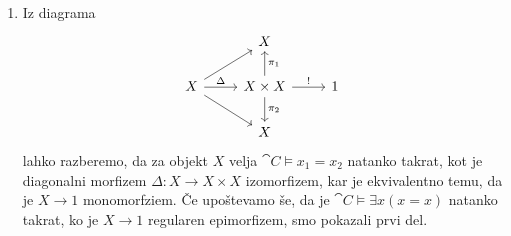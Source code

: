 \documentclass[../kategoricna_logika.tex]{subfiles}
\begin{document}
\begin{dokaz}
  \begin{enumerate}[label=(\roman*)]
    \item Iz diagrama
      \begin{equation*}
      \begin{tikzcd}[row sep=normal]
        & X & \\
        X \ar[ur] \ar[r, "\Delta"] \ar[dr] & X \times X \ar[u, "\pi_1"'] \ar[d, "\pi_2"] \ar[r, "!"] & 1 \\
        & X & 
      \end{tikzcd}
      \end{equation*}
      lahko razberemo, da za objekt $X$ velja 
      $\cat{C} \models x_1 = x_2$ natanko takrat, kot je diagonalni morfizem
      $\Delta : X \to X \times X$ izomorfizem, kar je ekvivalentno temu, da je $X \to 1$ monomorfziem.
      Če upoštevamo še, da je $\cat{C} \models \exists x (x = x)$ natanko takrat,
      ko je $X \to 1$ regularen epimorfizem, smo pokazali prvi del.
      

\end{enumerate}
\end{dokaz}
\end{document}
